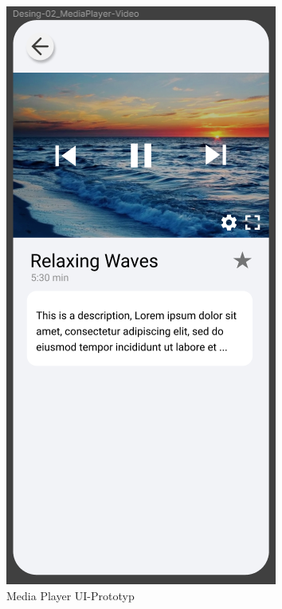 \begin{figure}[H]
    \begin{minipage}{0.5\textwidth}
        \centering
        \includegraphics[height=2\textwidth]{./pics/pMediaPlayer.png}
        \caption{Media Player UI-Prototyp}

\end{minipage}
\end{figure}
